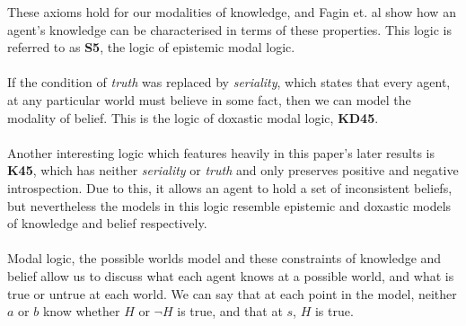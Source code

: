 These axioms hold for our modalities of knowledge, and Fagin et. al \cite{fagin1995reasoning} show
how an agent's knowledge can be characterised in terms of these properties.
This logic is referred to as {\bf S5}, the logic of epistemic modal logic.\\
\\
If the condition of {\em truth} was replaced by {\em seriality}, which states that every agent, at
any particular world must believe in some fact, then we can model the modality of belief.
This is the logic of doxastic modal logic, {\bf KD45}.\\
\\
Another interesting logic which features heavily in this paper's later results is {\bf K45}, which
has neither {\em seriality} or {\em truth} and only preserves positive and negative introspection.
Due to this, it allows an agent to hold a set of inconsistent beliefs, but nevertheless the models
in this logic resemble epistemic and doxastic models of knowledge and belief respectively.\\
\\
Modal logic, the possible worlds model and these constraints of knowledge and belief allow us to
discuss what each agent knows at a possible world, and what is true or untrue at each world.
We can say that at each point in the model, neither $a$ or $b$ know whether $H$ or $\neg H$ is true, and
that at $s$, $H$ is true.\\
\\
%
%
%
%
%
